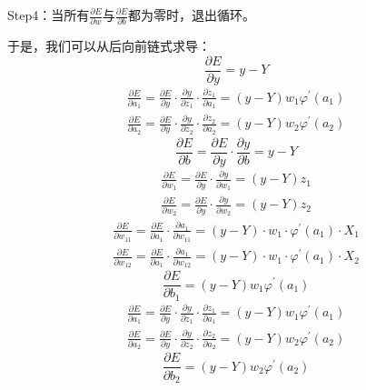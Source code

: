 Step4：当所有$\frac{\partial E}{\partial w}\text{与}\frac{\partial E}{\partial b}$都为零时，退出循环。

于是，我们可以从后向前链式求导：
\begin{equation}\frac{\partial E}{\partial y}=y-Y\end{equation}
\begin{equation}\begin{gathered}
		\frac{\partial E}{\partial a_1}=\frac{\partial E}{\partial y}\cdot\frac{\partial y}{\partial z_1}\cdot\frac{\partial z_1}{\partial a_1}=(y-Y)w_1\varphi^\prime(a_1) \\
		\frac{\partial E}{\partial a_2}=\frac{\partial E}{\partial y}\cdot\frac{\partial y}{\partial z_2}\cdot\frac{\partial z_2}{\partial a_2}=(y-Y)w_2\varphi^\prime(a_2) 
\end{gathered}\end{equation}
\begin{equation}\frac{\partial E}{\partial b}=\frac{\partial E}{\partial y}\cdot\frac{\partial y}{\partial b}=y-Y\end{equation}
\begin{equation}\begin{gathered}
		\frac{\partial E}{\partial w_1}=\frac{\partial E}{\partial y}\cdot\frac{\partial y}{\partial w_1}=(y-Y)z_1 \\
		\frac{\partial E}{\partial w_2}=\frac{\partial E}{\partial y}\cdot\frac{\partial y}{\partial w_2}=(y-Y)z_2 
\end{gathered}\end{equation}
\begin{equation}
	\begin{gathered}
		\frac{\partial E}{\partial w_{11}} = \frac{\partial E}{\partial a_1} \cdot \frac{\partial a_1}{\partial w_{11}} = (y - Y) \cdot w_1 \cdot \varphi^{\prime}(a_1) \cdot X_1 \\
		\frac{\partial E}{\partial w_{12}} = \frac{\partial E}{\partial a_1} \cdot \frac{\partial a_1}{\partial w_{12}} = (y - Y) \cdot w_1 \cdot \varphi^{\prime}(a_1) \cdot X_2
	\end{gathered}
\end{equation}
\begin{equation}\frac{\partial E}{\partial b_1}=(y-Y)w_1\varphi^{\prime}(a_1)\end{equation}
\begin{equation}
	\begin{gathered}
		\frac{\partial E}{\partial a_1} = \frac{\partial E}{\partial y} \cdot \frac{\partial y}{\partial z_1} \cdot \frac{\partial z_1}{\partial a_1} = (y - Y)w_1\varphi^\prime(a_1) \\
		\frac{\partial E}{\partial a_2} = \frac{\partial E}{\partial y} \cdot \frac{\partial y}{\partial z_2} \cdot \frac{\partial z_2}{\partial a_2} = (y - Y)w_2\varphi^\prime(a_2)
	\end{gathered}
\end{equation}
\begin{equation}\frac{\partial E}{\partial b_2}=(y-Y)w_2\varphi^{\prime}(a_2)\end{equation}

